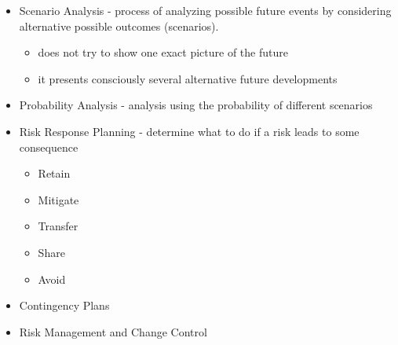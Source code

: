 \documentclass[8pt, letter]{extarticle}
\begin{document}
\begin{multicols}{2}
\begin{itemize}
        \item Scenario Analysis - process of analyzing possible future events by considering alternative possible outcomes (scenarios). 
            \begin{itemize}
                \item does not try to show one exact picture of the future
                \item it presents consciously several alternative future developments
            \end{itemize}
        \item Probability Analysis - analysis using the probability of different scenarios
        \item Risk Response Planning - determine what to do if a risk leads to some consequence
            \begin{itemize}
                \item Retain
                \item Mitigate
                \item Transfer
                \item Share
                \item Avoid
            \end{itemize}
        \item Contingency Plans
        \item Risk Management and Change Control
    \end{itemize}


\end{multicols}
\end{document}
